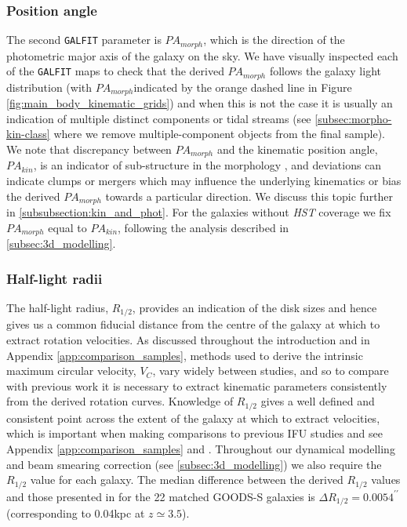 \documentclass[fleqn,usenatbib]{mn2e}
\begin{document}
\subsubsection{Position angle}\label{subsubsection:position_angle}
The second {\tt GALFIT} parameter is $PA_{morph}$, which is the direction of the photometric major axis of the galaxy on the sky.
We have visually inspected each of the {\tt GALFIT} maps to check that the derived $PA_{morph}$ follows the galaxy light distribution (with $PA_{morph}$indicated by the orange dashed line in Figure \ref{fig:main_body_kinematic_grids}) and when this is not the case it is usually an indication of multiple distinct components or tidal streams (see \cref{subsec:morpho-kin-class} where we remove multiple-component objects from the final sample).
We note that discrepancy between $PA_{morph}$ and the kinematic position angle, $PA_{kin}$, is an indicator of sub-structure in the morphology \citep[e.g.][]{Queyrel2012,Wisnioski2015,Rodrigues2016}, and deviations can indicate clumps or mergers which may influence the underlying kinematics or bias the derived $PA_{morph}$ towards a particular direction.
We discuss this topic further in \cref{subsubsection:kin_and_phot}.
For the galaxies without {\em HST} coverage we fix $PA_{morph}$ equal to $PA_{kin}$, following the analysis described in \cref{subsec:3d_modelling}.


\subsubsection{Half-light radii}\label{subsubsection:half-light_radii}
The half-light radius, $R_{1/2}$, provides an indication of the disk sizes and hence gives us a common fiducial distance from the centre of the galaxy at which to extract rotation velocities.
As discussed throughout the introduction and in Appendix \ref{app:comparison_samples}, methods used to derive the intrinsic maximum circular velocity, $V_{C}$, vary widely between studies, and so to compare with previous work it is necessary to extract kinematic parameters consistently from the derived rotation curves.
Knowledge of $R_{1/2}$ gives a well defined and consistent point across the extent of the galaxy at which to extract velocities, which is important when making comparisons to previous IFU studies and see Appendix \ref{app:comparison_samples} and \citep[e.g.][]{ForsterSchreiber2009,Epinat2012,Wisnioski2015,Stott2016,Harrison2017,Swinbank2017}.
Throughout our dynamical modelling and beam smearing correction (see \cref{subsec:3d_modelling}) we also require the $R_{1/2}$ value for each galaxy.
The median difference between the derived $R_{1/2}$ values and those presented in \cite{VanderWel2012} for the 22 matched GOODS-S galaxies is $\Delta R_{1/2} = 0.0054^{\prime\prime}$ (corresponding to 0.04kpc at $z\simeq3.5$).
\end{document}
